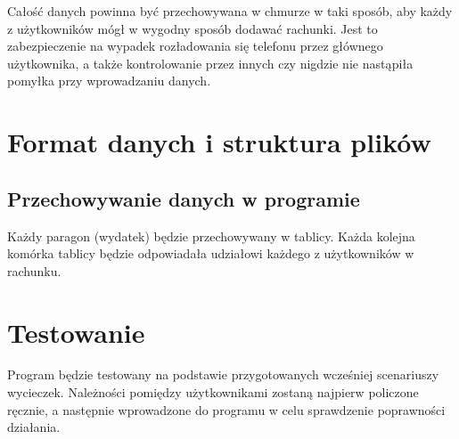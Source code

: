 \documentclass[12pt, letterpaper, ]{article}
\begin{document}
			Całość danych powinna być przechowywana w chmurze w taki sposób, aby każdy z użytkowników mógł w wygodny sposób dodawać rachunki. Jest to zabezpieczenie na wypadek rozładowania się telefonu przez głównego użytkownika, a także kontrolowanie przez innych czy nigdzie nie nastąpiła pomyłka przy wprowadzaniu danych. 
		
			
	\section[Format danych i struktura plików]{Format danych i struktura plików}
		\subsection{Przechowywanie danych w programie}
			Każdy paragon (wydatek) będzie przechowywany w tablicy. Każda kolejna komórka tablicy będzie odpowiadała udziałowi każdego z użytkowników w rachunku. 
	
	\section[Testowanie]{Testowanie}
	Program będzie testowany na podstawie przygotowanych wcześniej scenariuszy wycieczek. Należności pomiędzy użytkownikami zostaną najpierw policzone ręcznie, a następnie wprowadzone do programu w celu sprawdzenie poprawności działania. 		
		
\end{document}
